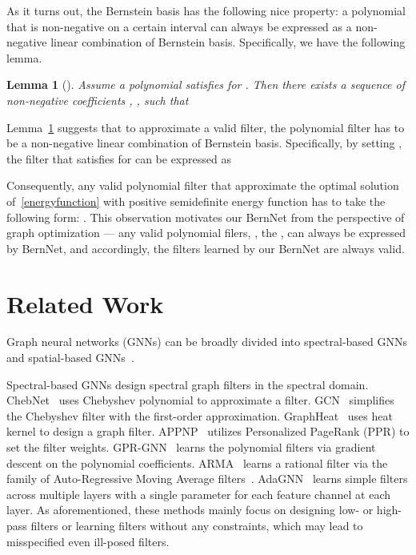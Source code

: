 \documentclass{article}
\newtheorem{lemma}{Lemma}[section]
\begin{document}
As it turns out, the Bernstein basis has the following nice property: a polynomial that is non-negative on a certain interval can always be expressed as a non-negative linear combination of Bernstein basis. Specifically, we have the following lemma.

\begin{lemma}[\cite{powers2000polynomials}]
\label{lem:non-negative}
Assume a polynomial  satisfies  for . 
Then there exists a sequence of non-negative coefficients , , such that 

\end{lemma}
Lemma~\ref{lem:non-negative} suggests that to approximate a valid filter, the polynomial filter  has to be a non-negative linear combination of Bernstein basis. 
Specifically, by setting , the filter  that satisfies  for  can be expressed as 

Consequently, any valid polynomial filter that approximate the optimal solution of~\eqref{energyfunction} with positive semidefinite energy function  has to take the following form: .
This observation motivates our BernNet from the perspective of graph optimization --- any valid polynomial filers, , the , can always be expressed by BernNet, and accordingly, the filters learned by our BernNet are always valid.





\section{Related Work}
Graph neural networks (GNNs) can be broadly divided into spectral-based GNNs and spatial-based GNNs~\cite{wu2020comprehensive}. 

Spectral-based GNNs design spectral graph filters in the spectral domain. 
ChebNet~\cite{Chebnet} uses Chebyshev polynomial to approximate a filter. 
GCN~\cite{kipf2016semi} simplifies the Chebyshev filter with the first-order approximation. 
GraphHeat~\cite{xu2020graphheat} uses heat kernel to design a graph filter. 
APPNP~\cite{appnp} utilizes Personalized PageRank (PPR) to set the filter weights.  
GPR-GNN~\cite{chien2021GPR-GNN}  learns the polynomial filters via gradient descent on the polynomial coefficients. 
ARMA~\cite{bianchi2021ARMA} learns a rational filter via the family of Auto-Regressive Moving Average filters~\cite{narang2013signal}. 
AdaGNN~\cite{adagnn} learns simple filters across multiple layers with a single parameter for each feature channel at each layer.
As aforementioned, these methods mainly focus on designing low- or high-pass filters or learning filters without any constraints, which may lead to misspecified even ill-posed filters.
\end{document}
